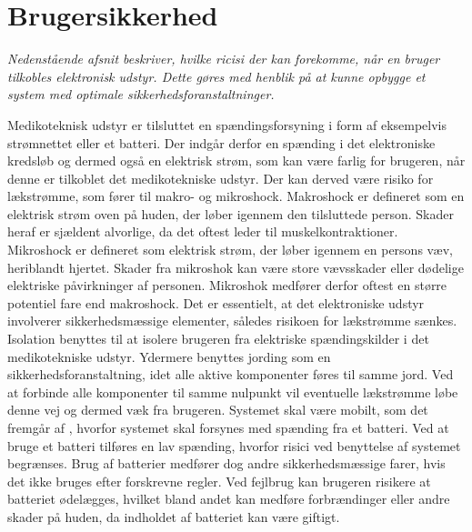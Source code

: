 \section{Brugersikkerhed}
\textit{Nedenstående afsnit beskriver, hvilke ricisi der kan forekomme, når en bruger tilkobles elektronisk udstyr. Dette gøres med henblik på at kunne opbygge et system med optimale sikkerhedsforanstaltninger.}

Medikoteknisk udstyr er tilsluttet en spændingsforsyning i form af eksempelvis strømnettet eller et batteri. Der indgår derfor en spænding i det elektroniske kredsløb og dermed også en elektrisk strøm, som kan være farlig for brugeren, når denne er tilkoblet det medikotekniske udstyr. Der kan derved være risiko for lækstrømme, som fører til makro- og mikroshock. Makroshock er defineret som en elektrisk strøm oven på huden, der løber igennem den tilsluttede person. Skader heraf er sjældent alvorlige, da det oftest leder til muskelkontraktioner. Mikroshock er defineret som elektrisk strøm, der løber igennem en persons væv, heriblandt hjertet. Skader fra mikroshok kan være store vævsskader eller dødelige elektriske påvirkninger af personen. Mikroshok medfører derfor oftest en større potentiel fare end makroshock. \citep{Webster2011} \newline
Det er essentielt, at det elektroniske udstyr involverer sikkerhedsmæssige elementer, således risikoen for lækstrømme sænkes. Isolation benyttes til at isolere brugeren fra elektriske spændingskilder i det medikotekniske udstyr. Ydermere benyttes jording som en sikkerhedsforanstaltning, idet alle aktive komponenter føres til samme jord. Ved at forbinde alle komponenter til samme nulpunkt vil eventuelle lækstrømme løbe denne vej og dermed væk fra brugeren. \citep{Webster2011} \newline 
Systemet skal være mobilt, som det fremgår af , hvorfor systemet skal forsynes med spænding fra et batteri. Ved at bruge et batteri tilføres en lav spænding, hvorfor risici ved benyttelse af systemet begrænses. Brug af batterier medfører dog andre sikkerhedsmæssige farer, hvis det ikke bruges efter forskrevne regler. Ved fejlbrug kan brugeren risikere at batteriet ødelægges, hvilket bland andet kan medføre forbrændinger eller andre skader på huden, da indholdet af batteriet kan være giftigt. 
%
%
